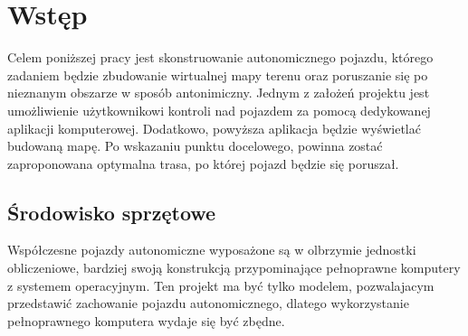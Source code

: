 \section{Wstęp}
    Celem poniższej pracy jest skonstruowanie autonomicznego pojazdu,
    którego zadaniem będzie zbudowanie wirtualnej mapy terenu oraz poruszanie się po nieznanym obszarze w sposób antonimiczny.
    Jednym z założeń projektu jest umożliwienie użytkownikowi kontroli nad pojazdem za pomocą dedykowanej aplikacji komputerowej.
    Dodatkowo, powyższa aplikacja będzie wyświetlać budowaną mapę.
    Po wskazaniu punktu docelowego, powinna zostać zaproponowana optymalna trasa, po której pojazd będzie się poruszał.


    \subsection{Środowisko sprzętowe}
        Współczesne pojazdy autonomiczne wyposażone są w olbrzymie jednostki obliczeniowe, bardziej swoją konstrukcją przypominające pełnoprawne komputery z systemem operacyjnym.
        Ten projekt ma być tylko modelem, pozwalajacym przedstawić zachowanie pojazdu autonomicznego, dlatego wykorzystanie pełnoprawnego komputera wydaje się być zbędne.


